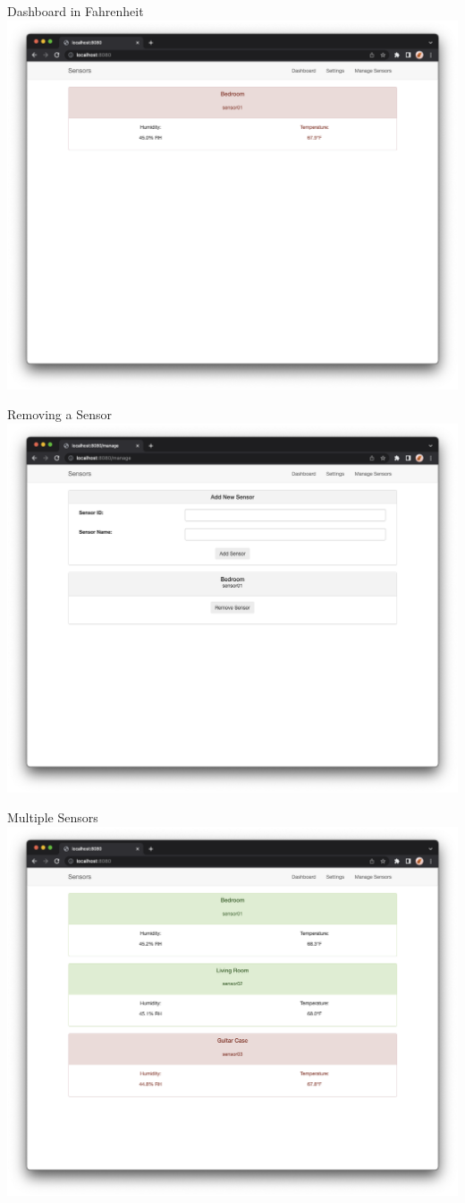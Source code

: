 \documentclass[aspectratio=169]{beamer}
\begin{document}
  \begin{frame}{\sectitle}{Dashboard in Fahrenheit}
    \centering\includegraphics[width=.75\textwidth]{images/06-in_F.png}
  \end{frame}
  \begin{frame}{\sectitle}{Removing a Sensor}
    \centering\includegraphics[width=.75\textwidth]{images/07-remove.png}
  \end{frame}
  \begin{frame}{\sectitle}{Multiple Sensors}
    \centering\includegraphics[width=.75\textwidth]{images/08-many.png}
  \end{frame}
\end{document}
